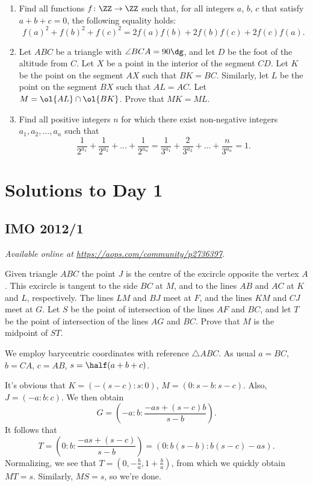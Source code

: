 \documentclass[11pt]{scrartcl}
\begin{document}
\begin{enumerate}[\bfseries 1.]
\item %
Find all functions $f \colon \ZZ \to \ZZ$ such that,
for all integers $a$, $b$, $c$ that satisfy $a+b+c=0$,
the following equality holds:
\[ f(a)^2+f(b)^2+f(c)^2 = 2f(a)f(b)+2f(b)f(c)+2f(c)f(a). \]

\item %
Let $ABC$ be a triangle with $\angle BCA = 90\dg$,
and let $D$ be the foot of the altitude from $C$.
Let $X$ be a point in the interior of the segment $CD$.
Let $K$ be the point on the segment $AX$ such that $BK = BC$.
Similarly, let $L$ be the point on the segment $BX$ such that $AL = AC$.
Let $M = \ol{AL} \cap \ol{BK}$.
Prove that $MK = ML$.

\item %
Find all positive integers $n$
for which there exist non-negative integers $a_1, a_2, \dots, a_n$
such that
\[ \frac{1}{2^{a_1}} + \frac{1}{2^{a_2}} + \dots + \frac{1}{2^{a_n}}
  = \frac{1}{3^{a_1}} + \frac{2}{3^{a_2}} + \dots + \frac{n}{3^{a_n}}
  = 1. \]

\end{enumerate}
\pagebreak

\section{Solutions to Day 1}
\subsection{IMO 2012/1}
\textsl{Available online at \url{https://aops.com/community/p2736397}.}
\begin{mdframed}[style=mdpurplebox,frametitle={Problem statement}]
Given triangle $ABC$ the point $J$ is the centre of the excircle
opposite the vertex $A$. This excircle is tangent to the side $BC$ at
$M$, and to the lines $AB$ and $AC$ at $K$ and $L$, respectively. The
lines $LM$ and $BJ$ meet at $F$, and the lines $KM$ and $CJ$ meet at
$G$. Let $S$ be the point of intersection of the lines $AF$ and $BC$,
and let $T$ be the point of intersection of the lines $AG$ and $BC$.
Prove that $M$ is the midpoint of $ST$.
\end{mdframed}
We employ barycentric coordinates with reference $\triangle ABC$.
As usual $a = BC$, $b = CA$, $c = AB$, $s = \half(a+b+c)$.

It's obvious that $K = ( -(s-c): s : 0)$, $M = ( 0 : s-b : s-c)$.
Also, $J = (-a : b : c)$.
We then obtain
\[ G = \left( -a: b : \frac{-as + (s-c)b}{s-b} \right). \]
It follows that
\[ T = \left( 0 : b : \frac{-as + (s-c)}{s-b} \right) = ( 0 : b(s-b) : b(s-c) - as). \]
Normalizing, we see that $T = \left( 0, -\frac{b}{a}, 1 + \frac{b}{a} \right)$,
from which we quickly obtain $MT = s$.
Similarly, $MS = s$, so we're done.
\pagebreak
\end{document}
